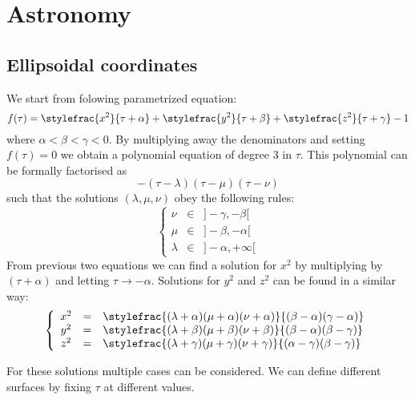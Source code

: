 \chapter{Astronomy}

\section{Ellipsoidal coordinates}

We start from folowing parametrized equation:
\begin{equation}\index{coordinates!ellipsoidal}
	\label{astronomy:ellipsoidal_defining_function}
	f(\tau) = \stylefrac{x^2}{\tau + \alpha} + \stylefrac{y^2}{\tau + \beta} + \stylefrac{z^2}{\tau + \gamma} - 1
\end{equation}
where $\alpha<\beta<\gamma<0$. By multiplying away the denominators and setting $f(\tau) = 0$ we obtain a polynomial equation of degree 3 in $\tau$. This polynomial can be formally factorised as
\begin{equation}
	-(\tau-\lambda)(\tau-\mu)(\tau-\nu)
\end{equation}
such that the solutions $(\lambda, \mu, \nu)$ obey the following rules:
\[
	\left\{
    \begin{array}{ccl}
		\nu&\in&]-\gamma, -\beta[\\
    	\mu&\in&]-\beta, -\alpha[\\
    	\lambda&\in&]-\alpha, +\infty[
	\end{array}
    \right.
\]
From previous two equations we can find a solution for $x^2$ by multiplying by $(\tau+\alpha)$ and letting $\tau\rightarrow-\alpha$. Solutions for $y^2$ and $z^2$ can be found in a similar way:
\begin{equation}
	\label{astronomy:ellipsoidal_coordinates}
	\left\{
    \begin{array}{ccl}
		x^2 &=& \stylefrac{(\lambda + \alpha)(\mu + \alpha)(\nu + \alpha)}{(\beta - \alpha)(\gamma - \alpha)}\\
        y^2 &=& \stylefrac{(\lambda + \beta)(\mu + \beta)(\nu + \beta)}{(\beta - \alpha)(\beta - \gamma)}\\
        z^2 &=& \stylefrac{(\lambda + \gamma)(\mu + \gamma)(\nu + \gamma)}{(\alpha - \gamma)(\beta - \gamma)}
	\end{array}
    \right.
\end{equation}

\noindent For these solutions multiple cases can be considered. We can define different surfaces by fixing $\tau$ at different values.

